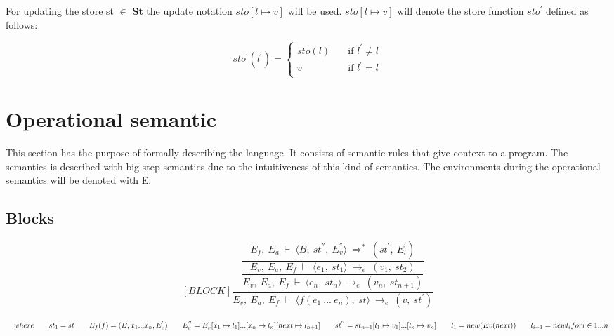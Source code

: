   For updating the store st \begin{math} \in \end{math} \textbf{St} the update notation \begin{math} sto[l \mapsto v] \end{math} will be used. \begin{math} sto[l \mapsto v] \end{math} will denote the store function \begin{math}sto^{'} \end{math} defined as follows:
  
  \[ sto^{'}(l^{'}) =
    \begin{cases}
      sto(l)       & \quad \text{if } l^{'} \not= l\\
      v  & \quad \text{if } l^{'} = l\\
    \end{cases}
  \]
  	
  \section{Operational semantic}
  This section has the purpose of formally describing the language. It consists of semantic rules that give context to a program. 
  The semantics is described with big-step semantics due to the intuitiveness of this kind of semantics. 
  The environments during the operational semantics will be denoted with E.
  
  \subsection{Blocks}
    \[
    [BLOCK]
    \dfrac{\dfrac{E_f, \ E_a \ \vdash \ \langle B, \ st^{''}, \ E_v^{''} \rangle \ \Rightarrow^* \ (st^{'}, \ E_l^{'})}{\dfrac{E_v, \ E_a, \ E_f \ \vdash \ \langle e_1, \ st_1 \rangle \ \rightarrow_e \ (v_1, \ st_2)}{E_v, \ E_a, \ E_f \ \vdash \ \langle e_n, \ st_n \rangle \ \rightarrow_e \ (v_n, \ st_{n+1})}}}{E_v, \ E_a, \ E_f \ \vdash \ \langle f(e_1 \ ... \ e_n), \ st \rangle \ \rightarrow_e \ (v, \ st^{'})}
    \]
    
	\begin{math}
		\quad where \newline
		\qquad st_1 = st \newline
		\qquad E_f(f) = (B, x_1 ... x_n, E_v^{'}) \newline
		\qquad E_v^{''} = E_v^{'}[x_1 \mapsto l_1] ... [x_n \mapsto l_n] [next \mapsto l_{n+1}] \newline
		\qquad st^{''} = st_{n+1}[l_1 \mapsto v_1] ... [l_n \mapsto v_n] \newline
		\qquad l_1 = new (Ev(next)) \newline
		\qquad l_{i+1}= new l_i for i \in {1 ... n}
	\end{math}
  
